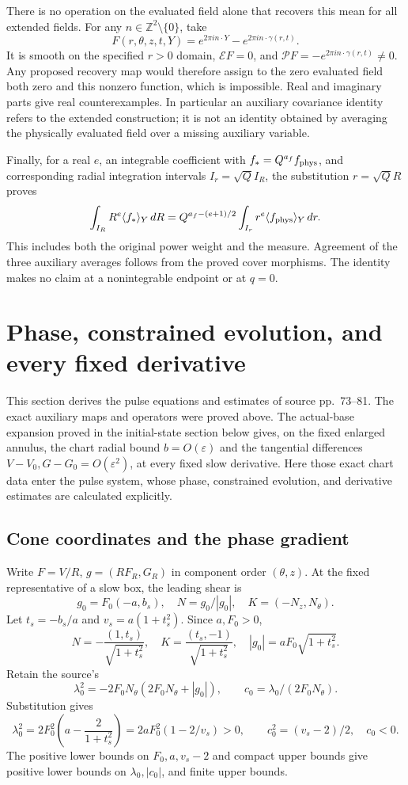 \documentclass[10pt,a4paper]{article}
\begin{document}
There is no operation on the evaluated field alone that recovers this
mean for all extended fields.  For any $n\in\mathbb Z^2\setminus\{0\}$,
take
\[
 F(r,\theta,z,t,Y)=e^{2\pi in\cdot Y}
                       -e^{2\pi in\cdot\gamma(r,t)}.
\]
It is smooth on the specified $r>0$ domain, $\mathcal EF=0$, and
$\mathcal PF=-e^{2\pi in\cdot\gamma(r,t)}\ne0$.
Any proposed recovery map would therefore assign to the zero evaluated
field both zero and this nonzero function, which is impossible.  Real
and imaginary parts give real counterexamples.  In particular an
auxiliary covariance identity refers to the extended construction;
it is not an identity obtained by averaging the physically evaluated
field over a missing auxiliary variable.

Finally, for a real $e$, an integrable coefficient with
$f_*=Q^{a_f}f_{\rm phys}$, and corresponding radial integration
intervals $I_r=\sqrt Q I_R$, the substitution $r=\sqrt Q R$ proves
\[
 \int_{I_R}R^e\langle f_*\rangle_Y\,dR
 =Q^{a_f-(e+1)/2}
  \int_{I_r}r^e\langle f_{\rm phys}\rangle_Y\,dr.
\]
This includes both the original power weight and the measure.
Agreement of the three auxiliary averages follows from the proved
cover morphisms.  The identity makes no claim at a nonintegrable
endpoint or at $q=0$.


\section{Phase, constrained evolution, and every fixed derivative}\label{si:phase-constrained-evolution-and-every-fixed-derivative}

This section derives the pulse equations and estimates of source pp.~73--81. The exact auxiliary maps and operators were proved above. The actual-base expansion proved in the initial-state section below gives, on the fixed enlarged annulus, the chart radial bound \(b=O(\varepsilon)\) and the tangential differences \(V-V_0,G-G_0=O(\varepsilon^2)\), at every fixed slow derivative. Here those exact chart data enter the pulse system, whose phase, constrained evolution, and derivative estimates are calculated explicitly.

\subsection{Cone coordinates and the phase gradient}\label{si:cone-coordinates-and-the-phase-gradient}

Write \(F=V/R\), \(g=(RF_R,G_R)\) in component order \((\theta,z)\). At the fixed representative of a slow box, the leading shear is \[
g_0=F_0(-a,b_s),\quad N=g_0/|g_0|,\quad K=(-N_z,N_\theta).
\] Let \(t_s=-b_s/a\) and \(v_s=a(1+t_s^2)\). Since \(a,F_0>0\), \[
N=-\frac{(1,t_s)}{\sqrt{1+t_s^2}},\quad
K=\frac{(t_s,-1)}{\sqrt{1+t_s^2}},\quad
|g_0|=aF_0\sqrt{1+t_s^2}.
\] Retain the source's \[
\lambda_0^2=-2F_0N_\theta(2F_0N_\theta+|g_0|),
\qquad c_0=\lambda_0/(2F_0N_\theta).
\] Substitution gives \[
\lambda_0^2
=2F_0^2\left(a-\frac2{1+t_s^2}\right)
=2aF_0^2(1-2/v_s)>0,\qquad
c_0^2=(v_s-2)/2,\quad c_0<0.
\] The positive lower bounds on \(F_0,a,v_s-2\) and compact upper bounds give positive lower bounds on \(\lambda_0,|c_0|\), and finite upper bounds.
\end{document}
